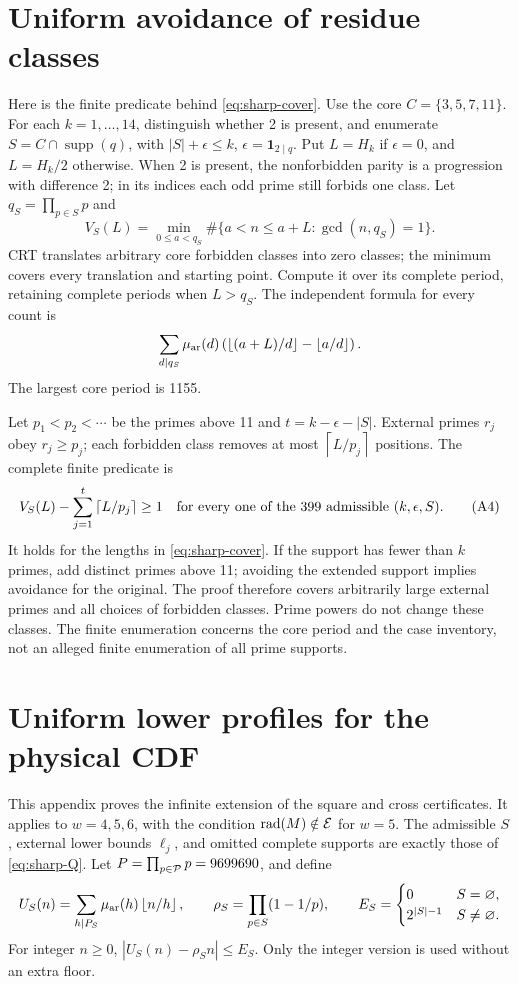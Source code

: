 \documentclass[11pt]{article}
\theoremstyle{definition}\newtheorem{definition}[theorem]{Definition}
\theoremstyle{remark}\newtheorem{remark}[theorem]{Remark}
\newcommand{\rad}{\operatorname{rad}}
\newcommand{\unit}{\mathbf1}
\newcommand{\floor}[1]{\left\lfloor #1\right\rfloor}
\newcommand{\ceil}[1]{\left\lceil #1\right\rceil}
\begin{document}
\section{Uniform avoidance of residue classes}\label{app:sharp-cover}
Here is the finite predicate behind \eqref{eq:sharp-cover}.
Use the core \(C=\{3,5,7,11\}\).
For each \(k=1,\ldots,14\), distinguish whether 2 is present,
and enumerate \(S=C\cap\operatorname{supp}(q)\), with
\(|S|+\epsilon\le k\), \(\epsilon=\unit_{2\mid q}\).
Put \(L=H_k\) if \(\epsilon=0\), and \(L=H_k/2\) otherwise.
When 2 is present, the nonforbidden parity is a progression with
difference 2; in its indices each odd prime still forbids one class.
Let \(q_S=\prod_{p\in S}p\) and
\[
 V_S(L)=\min_{0\le a<q_S}
 \#\{a<n\le a+L:\gcd(n,q_S)=1\}.
\]
CRT translates arbitrary core forbidden classes into zero classes;
the minimum covers every translation and starting point.
Compute it over its complete period, retaining complete periods when
\(L>q_S\). The independent formula for every count is
\[
 \sum_{d\mid q_S}\mu_{\rm ar}(d)
 \left(\floor{(a+L)/d}-\floor{a/d}\right).
\]
The largest core period is 1155.

Let \(p_1<p_2<\cdots\) be the primes above 11 and
\(t=k-\epsilon-|S|\). External primes \(r_j\) obey \(r_j\ge p_j\);
each forbidden class removes at most \(\ceil{L/p_j}\) positions.
The complete finite predicate is
\[
 V_S(L)-\sum_{j=1}^t\ceil{L/p_j}\ge1
 \quad\hbox{for every one of the 399 admissible }(k,\epsilon,S).       \tag{A4}\label{eq:sharp-cover-predicate}
\]
It holds for the lengths in \eqref{eq:sharp-cover}.
If the support has fewer than \(k\) primes, add distinct primes above 11;
avoiding the extended support implies avoidance for the original.
The proof therefore covers arbitrarily large external primes and all
choices of forbidden classes. Prime powers do not change these classes.
The finite enumeration concerns the core period and the case inventory,
not an alleged finite enumeration of all prime supports.

\section{Uniform lower profiles for the physical CDF}\label{app:sharp-negative}
This appendix proves the infinite extension of the square and cross
certificates. It applies to \(w=4,5,6\), with the condition
\(\rad(M)\notin{\cal E}\) for \(w=5\).
The admissible \(S\), external lower bounds \(\ell_j\), and omitted
complete supports are exactly those of \eqref{eq:sharp-Q}.
Let \(P=\prod_{p\in{\cal P}}p=9699690\), and define
\[
 U_S(n)=\sum_{h\mid P_S}\mu_{\rm ar}(h)\floor{n/h},\qquad
 \rho_S=\prod_{p\in S}(1-1/p),\qquad
 E_S=\begin{cases}0&S=\varnothing,\\2^{|S|-1}&S\ne\varnothing.\end{cases}
\]
For integer \(n\ge0\), \(|U_S(n)-\rho_S n|\le E_S\).
Only the integer version is used without an extra floor.
\end{document}
